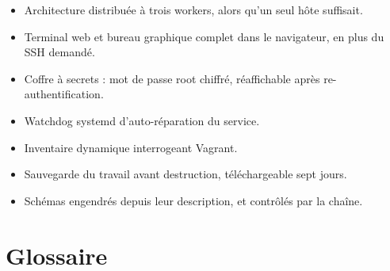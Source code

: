 \begin{itemize}
\item Architecture distribuée à trois workers, alors qu'un seul hôte suffisait.
\item Terminal web et bureau graphique complet dans le navigateur, en plus du
  SSH demandé.
\item Coffre à secrets : mot de passe root chiffré, réaffichable après
  re-authentification.
\item Watchdog systemd d'auto-réparation du service.
\item Inventaire dynamique interrogeant Vagrant.
\item Sauvegarde du travail avant destruction, téléchargeable sept jours.
\item Schémas engendrés depuis leur description, et contrôlés par la chaîne.
\end{itemize}

\chapter{Glossaire}

